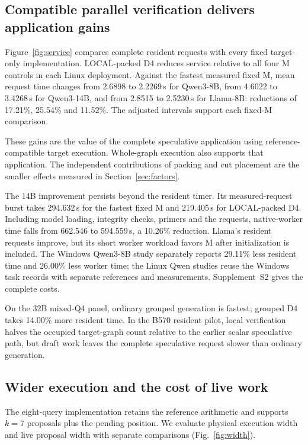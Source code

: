 \subsection{Compatible parallel verification delivers application gains}
\label{sec:application}
Figure~\ref{fig:service} compares complete resident requests with every fixed target-only implementation. LOCAL-packed D4 reduces service relative to all four M controls in each Linux deployment. Against the fastest measured fixed M, mean request time changes from 2.6898 to 2.2269\,s for Qwen3-8B, from 4.6022 to 3.4268\,s for Qwen3-14B, and from 2.8515 to 2.5230\,s for Llama-8B: reductions of 17.21\%, 25.54\% and 11.52\%. The adjusted intervals support each fixed-M comparison.



These gains are the value of the complete speculative application using reference-compatible target execution. Whole-graph execution also supports that application. The independent contributions of packing and cut placement are the smaller effects measured in Section~\ref{sec:factors}.

The 14B improvement persists beyond the resident timer. Its measured-request burst takes 294.632\,s for the fastest fixed M and 219.405\,s for LOCAL-packed D4. Including model loading, integrity checks, primers and the requests, native-worker time falls from 662.546 to 594.559\,s, a 10.26\% reduction. Llama's resident requests improve, but its short worker workload favors M after initialization is included. The Windows Qwen3-8B study separately reports 29.11\% less resident time and 26.00\% less worker time; the Linux Qwen studies reuse the Windows task records with separate references and measurements. Supplement~S2 gives the complete costs.

On the 32B mixed-Q4 panel, ordinary grouped generation is fastest; grouped D4 takes 14.00\% more resident time. In the B570 resident pilot, local verification halves the occupied target-graph count relative to the earlier scalar speculative path, but draft work leaves the complete speculative request slower than ordinary generation.

\subsection{Wider execution and the cost of live work}
\label{sec:width}
The eight-query implementation retains the reference arithmetic and supports $k=7$ proposals plus the pending position. We evaluate physical execution width and live proposal width with separate comparisons (Fig.~\ref{fig:width}).



